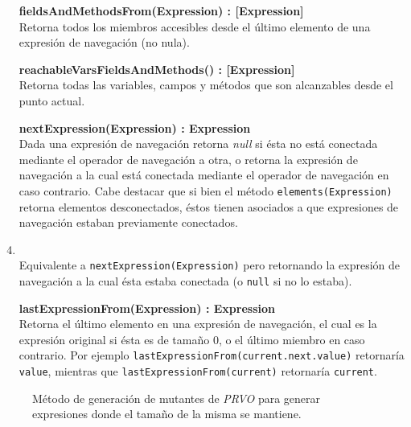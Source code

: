 \begin{enumerate}[leftmargin=.75cm,align=left]
	\item[\textbf{fieldsAndMethodsFrom(Expression) : [Expression]}]\mbox{}\\ Retorna todos los miembros accesibles desde el \'ultimo elemento de una expresi\'on de navegaci\'on (no nula).
	
	\item[\textbf{reachableVarsFieldsAndMethods() : [Expression]}]\mbox{}\\ Retorna todas las variables, campos y m\'etodos que son alcanzables desde el punto actual.
	
	\item[\textbf{nextExpression(Expression) : Expression}]\mbox{}\\ Dada una expresi\'on de navegaci\'on retorna \emph{null} si \'esta no est\'a conectada mediante el operador de navegaci\'on a otra, o retorna la expresi\'on de navegaci\'on a la cual est\'a conectada mediante el operador de navegaci\'on en caso contrario. Cabe destacar que si bien el m\'etodo \lstinline{elements(Expression)} retorna elementos desconectados, \'estos tienen asociados a que expresiones de navegaci\'on estaban previamente conectados.
	
	\item[\textbf{previousExpression(Expression) : Expression}]\mbox{}\\ Equivalente a \lstinline{nextExpression(Expression)} pero retornando la expresi\'on de navegaci\'on a la cual \'esta estaba conectada (o \lstinline{null} si no lo estaba).
	
	\item[\textbf{lastExpressionFrom(Expression) : Expression}]\mbox{}\\ Retorna el \'ultimo elemento en una expresi\'on de navegaci\'on, el cual es la expresi\'on original si \'esta es de tama\~no $0$, o el \'ultimo miembro en caso contrario. Por ejemplo \lstinline{lastExpressionFrom(current.next.value)} retornar\'ia \lstinline{value}, mientras que \lstinline{lastExpressionFrom(current)} retornar\'ia \lstinline{current}.
\end{enumerate}

\begin{figure}
	
	\caption[Funciones \emph{PRVO}, \emph{\#sameLength}]{M\'etodo de generaci\'on de mutantes de \emph{PRVO} para generar expresiones donde el tama\~no de la misma se mantiene.}
	\label{figures.code.prvoMethods.sameLength}
\end{figure}

